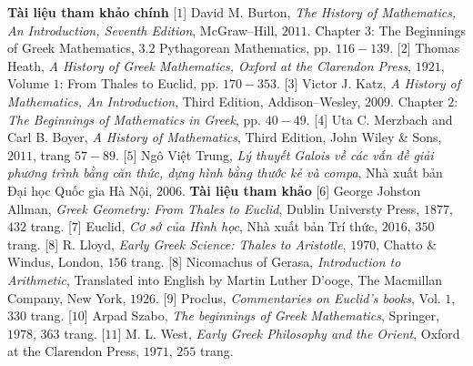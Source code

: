 \begin{multicols}{2}
	\vskip 0.1cm
	\textbf{\color{lichsutoanhoc}Tài liệu tham khảo chính}
	\vskip 0.1cm
	[$1$] David M. Burton, \textit{The History of Mathematics, An Introduction, Seventh Edition}, McGraw--Hill, $2011$. Chapter $3$: The Beginnings of Greek Mathematics, $3.2$ Pythagorean Mathematics, pp. $116-139$.
	\vskip 0.1cm
	[$2$] Thomas Heath, \textit{A History of Greek Mathematics, Oxford at the Clarendon Press}, $1921$, Volume $1$: From Thales to Euclid, pp. $170-353$.
	\vskip 0.1cm   
	[$3$] Victor J. Katz, \textit{A History of Mathematics, An Introduction}, Third Edition, Addison--Wesley, $2009$. Chapter $2$: \textit{The Beginnings of Mathematics in Greek}, pp. $40-49$.
	\vskip 0.1cm
	[$4$] Uta C. Merzbach and Carl B. Boyer, \textit{A
	History of Mathematics}, Third Edition, John Wiley \& Sons, $2011$, trang $57-89$.
	\vskip 0.1cm
	[$5$] Ngô Việt Trung, \textit{Lý thuyết Galois về các vấn đề giải phương trình bằng căn thức, dựng hình bằng thước kẻ và compa}, Nhà xuất bản Đại học Quốc gia Hà Nội, $2006$.
	\vskip 0.1cm
	\textbf{\color{lichsutoanhoc}Tài liệu tham khảo}
	\vskip 0.1cm 
	[$6$] George Johston Allman, \textit{Greek Geometry: From Thales to Euclid}, Dublin Universty Press, $1877$, $432$ trang.  
	\vskip 0.1cm
	[$7$] Euclid, \textit{Cơ sở của Hình học}, Nhà xuất bản Trí thức, $2016$, $350$ trang.
	\vskip 0.1cm
	[$8$] R. Lloyd, \textit{Early Greek Science: Thales to Aristotle}, $1970$, Chatto \& Windus, London, $156$ trang. 
	\vskip 0.1cm
	[$8$] Nicomachus of Gerasa, \textit{Introduction to Arithmetic}, Translated into English by Martin Luther D’ooge, The Macmillan Company, New York, $1926$.
	\vskip 0.1cm
	[$9$] Proclus, \textit{Commentaries on Euclid’s books}, Vol. $1$, $330$ trang.
	\vskip 0.1cm
	[$10$] Arpad Szabo, \textit{The beginnings of Greek Mathematics}, Springer, $1978$, $363$ trang.
	\vskip 0.1cm
	[$11$] M. L. West, \textit{Early Greek Philosophy and the Orient}, Oxford at the Clarendon Press, $1971$, $255$ trang.
\end{multicols}
%	
